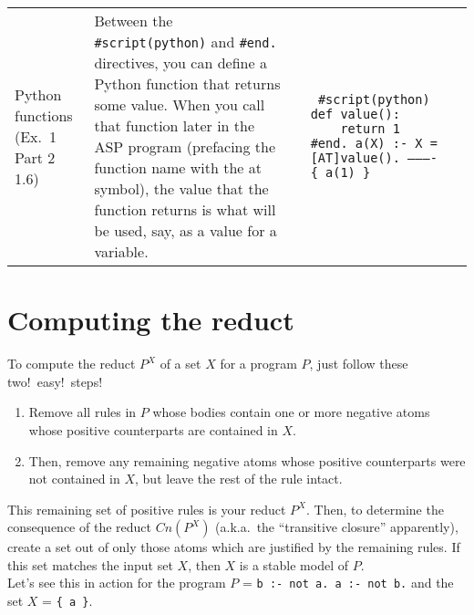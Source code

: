 \documentclass[10pt,a4paper,landscape]{article}
\begin{document}
\begin{longtable}{Lp{13.5cm}lXX}
	Python functions \newline (Ex.\ 1 Part 2 1.6)
		& Between the \texttt{\#script(python)} and \texttt{\#end.} directives, you can define a Python function that returns some value.
		When you call that function later in the ASP program (prefacing the function name with the at symbol), the value that the function returns is what will be used, say, as a value for a variable.
		
		&& {\small\texttt{%
			\#script(python) \newline
			def value(): \newline
			\mbox{~~~~}return 1 \newline
			\#end. \newline \newline
			a(X) :- X = [AT]value(). \newline
			---------- \newline
			\{ a(1) \}
		}} \\
%	
\end{longtable}


\section{Computing the reduct}
\label{sec:reduct}

To compute the reduct $P^X$ of a set $X$ for a program $P$, just follow these two!\ easy!\ steps!
\begin{enumerate}[noitemsep]
	\item Remove all rules in $P$ whose bodies contain one or more negative atoms whose positive counterparts are contained in $X$.
	\item Then, remove any remaining negative atoms whose positive counterparts were not contained in $X$, but leave the rest of the rule intact.
\end{enumerate}

\noindent This remaining set of positive rules is your reduct $P^X$.
Then, to determine the consequence of the reduct $Cn(P^X)$ (a.k.a.\ the ``transitive closure'' apparently), create a set out of only those atoms which are justified by the remaining rules.
If this set matches the input set $X$, then $X$ is a stable model of $P$.\\

\noindent Let's see this in action for the program $P$ = \texttt{b :- not a. a :- not b.} and the set $X$ = \texttt{\{ a \}}.
\end{document}

